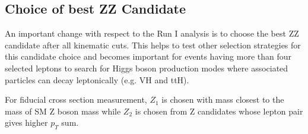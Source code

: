 \subsection{Choice of best ZZ Candidate}
\label{sec:zzbestcand}

An important change with respect to the Run I analysis is to choose the best ZZ candidate after all kinematic cuts. This helps to test other selection strategies for this candidate choice and becomes important for events having more than four selected leptons to search for Higgs boson production modes where associated particles can decay leptonically (e.g. VH and ttH).

For fiducial cross section measurement, $Z_{1}$ is chosen with mass closest to the mass of SM Z boson mass while $Z_{2}$ is chosen from Z candidates whose lepton pair gives higher $p_{T}$ sum. 


